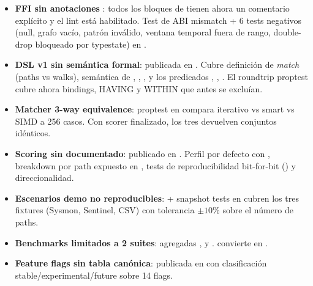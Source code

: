 \begin{itemize}
    \item \textbf{FFI sin anotaciones }: todos los
    bloques  de 
    tienen ahora un comentario  explícito y el
    lint  está habilitado. Test de ABI
    mismatch + 6 tests negativos (null, grafo vacío, patrón
    inválido, ventana temporal fuera de rango, double-drop bloqueado
    por typestate) en .

    \item \textbf{DSL v1 sin semántica formal}: publicada en
    . Cubre definición de
    \emph{match} (paths vs walks), semántica de ,
    , , y los predicados
    \code{\textasciitilde}, , . El roundtrip
    proptest cubre ahora bindings, HAVING y WITHIN que antes se
    excluían.

    \item \textbf{Matcher 3-way equivalence}: proptest en
    compara iterativo vs smart vs SIMD a 256 casos. Con scorer
    finalizado, los tres devuelven conjuntos idénticos.

    \item \textbf{Scoring sin  documentado}:
    publicado en . Perfil por
    defecto con , breakdown por path expuesto en
    , tests de
    reproducibilidad bit-for-bit () y
    direccionalidad.

    \item \textbf{Escenarios demo no reproducibles}:
     + snapshot tests en
     cubren los
    tres fixtures (Sysmon, Sentinel, CSV) con tolerancia
    $\pm 10\%$ sobre el número de paths.

    \item \textbf{Benchmarks limitados a 2 suites}: agregadas
    ,  y
    . 
    convierte  en
    .

    \item \textbf{Feature flags sin tabla canónica}: publicada en
     con clasificación
    stable/experimental/future sobre 14 flags.
\end{itemize}

